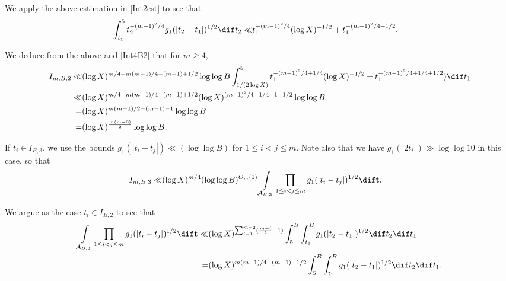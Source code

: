 \documentclass[twoside,leqno,10pt, A4]{amsart}
\begin{document}
   We apply the above estimation in \eqref{Int2est} to see that
\begin{align*}
\begin{split}
 \int_{t_1}^{5} t_2^{-(m-1)^2/4} g_1(|t_2-t_1|)^{1/2}\dif t_2 \ll &  t_1^{-(m-1)^2/4} (\log X)^{-1/2}+t_1^{-(m-1)^2/4+1/2}.
\end{split}
\end{align*}

   We deduce from the above and \eqref{Int4B2} that for $m \geq 4$,
\begin{align}
\label{Int4B1}
\begin{split}
  I_{m,B,2} \ll & (\log X)^{m/4+m(m-1)/4-(m-1)+1/2}\log \log B\int_{1/(2\log X)}^{5}t_1^{-(m-1)^2/4+1/4} (\log X)^{-1/2}+t_1^{-(m-1)^2/4+1/4+1/2})\dif t_1 \\
  \ll & (\log X)^{m/4+m(m-1)/4-(m-1)+1/2}(\log X)^{(m-1)^2/4-1/4-1-1/2}\log \log B \\
  =& (\log X)^{m(m-1)/2-(m-1)-1}\log \log B \\
  =& (\log X)^{\frac {m(m-3)}{2}}\log \log B.
\end{split}
\end{align}

   If $t_i \in I_{B,3}$,  we use the bounds $g_1(|t_i+t_j|)\ll (\log \log B)$ for $1\leq i<j\leq m$.  Note also that we have $g_1(|2t_i|) \gg \log \log 10$ in this case, so that
\begin{align}
\label{IB3bound}
I_{m,B,3} \ll & (\log X)^{m/4} (\log \log B)^{O_m(1)}\int\limits_{\mathcal{A}_{B,3}}\prod_{1\leq i<j\leq m} g_1(|t_i-t_j|)^{1/2}\dif \mathbf{t}.
\end{align}

    We argue as the case $t_i \in I_{B,2}$ to see that
\begin{align}
\begin{split}
\label{I3}
 \int\limits_{\mathcal{A}_{B,3}}\prod_{1\leq i<j\leq m} g_1(|t_i-t_j|)^{1/2}\dif \mathbf{t} \ll & (\log X)^{\sum^{m-2}_{i=1}(\frac {m-i}2-1)}\int_{5}^{B}\int_{t_1}^{B}g_1(|t_2-t_1|)^{1/2} \dif t_2\dif t_1 \\
 =& (\log X)^{m(m-1)/4-(m-1)+1/2}\int_{5}^{B}\int_{t_1}^{B}g_1(|t_2-t_1|)^{1/2} \dif t_2\dif t_1.
\end{split}
\end{align}
\end{document}
